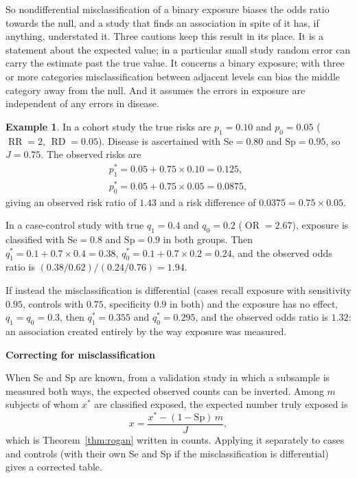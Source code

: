 \documentclass[11pt,a4paper]{article}
\numberwithin{equation}{section}
\DeclareMathOperator{\OR}{OR}
\DeclareMathOperator{\RR}{RR}
\DeclareMathOperator{\RD}{RD}
\theoremstyle{definition}
\newtheorem{exa}[thm]{Example}
\newcommand{\subhead}[1]{%
  \par\medskip\noindent\textbf{#1}\par\nobreak\smallskip}
\begin{document}
So nondifferential misclassification of a binary exposure biases the odds ratio towards the null, and a study that finds an association
in spite of it has, if anything, understated it. Three cautions keep this result in its place. It is a statement about the expected
value; in a particular small study random error can carry the estimate past the true value. It concerns a binary exposure; with three or
more categories misclassification between adjacent levels can bias the middle category away from the null. And it assumes the errors in
exposure are independent of any errors in disease.

\begin{exa}
\label{exa:misclass}
In a cohort study the true risks are $p_1 = 0.10$ and $p_0 = 0.05$ ($\RR = 2$, $\RD = 0.05$). Disease is ascertained with $\text{Se} = 0.80$ and
$\text{Sp} = 0.95$, so $J = 0.75$. The observed risks are
\begin{gather*}
p_1^* = 0.05 + 0.75 \times 0.10 = 0.125, \\
p_0^* = 0.05 + 0.75 \times 0.05 = 0.0875 ,
\end{gather*}
giving an observed risk ratio of $1.43$ and a risk difference of $0.0375 = 0.75 \times 0.05$.

In a case-control study with true $q_1 = 0.4$ and $q_0 = 0.2$ ($\OR = 2.67$), exposure is classified with $\text{Se} = 0.8$ and $\text{Sp} = 0.9$ in both
groups. Then $q_1^* = 0.1 + 0.7 \times 0.4 = 0.38$, $q_0^* = 0.1 + 0.7 \times 0.2 = 0.24$, and the observed odds ratio is
$(0.38/0.62)/(0.24/0.76) = 1.94$.

If instead the misclassification is differential (cases recall exposure with sensitivity $0.95$, controls with $0.75$, specificity $0.9$ in both)
and the exposure has no effect, $q_1 = q_0 = 0.3$, then $q_1^* = 0.355$ and $q_0^* = 0.295$, and the observed odds ratio is $1.32$: an association
created entirely by the way exposure was measured.
\end{exa}

\subhead{Correcting for misclassification}

When Se and Sp are known, from a validation study in which a subsample is measured both ways, the expected observed counts can be
inverted. Among $m$ subjects of whom $x^*$ are classified exposed, the expected number truly exposed is
\[
x = \frac{x^* - (1 - \text{Sp})\,m}{J} ,
\]
which is Theorem~\ref{thm:rogan} written in counts. Applying it separately to cases and controls (with their own Se and Sp if the
misclassification is differential) gives a corrected table.
\end{document}
